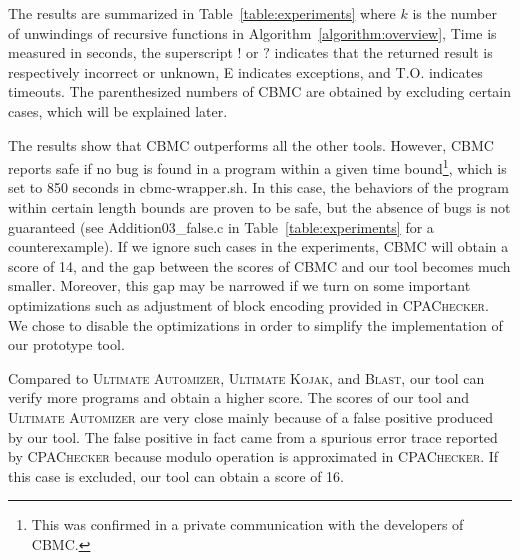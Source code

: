 The results are summarized in
Table~\ref{table:experiments} where $k$ is the number of unwindings of
recursive functions in Algorithm~\ref{algorithm:overview}, Time is
measured in seconds, the superscript $!$ or $?$ indicates that the
returned result is respectively incorrect or unknown, E indicates
exceptions, and T.O. indicates timeouts.
The parenthesized numbers of CBMC are obtained by excluding
certain cases, which will be explained later.

The results show that CBMC outperforms all the other tools.
However, CBMC reports safe if no bug is found in a program within a
given time bound\footnote{This was confirmed in a private
  communication with the developers of CBMC.}, which is set to 850
seconds in cbmc-wrapper.sh.
In this case, the behaviors of the program within certain length
bounds are proven to be safe, but the absence of bugs is not
guaranteed (see Addition03\_false.c in Table~\ref{table:experiments} for
a counterexample).
If we ignore such cases in the experiments, CBMC will obtain a score
of 14, and the gap between the scores of CBMC and our tool becomes
much smaller.
Moreover, this gap may be narrowed if we turn on some important
optimizations such as adjustment of block encoding provided in
\textsc{CPAChecker}.
We chose to disable the optimizations in order to simplify the
implementation of our prototype tool.

Compared to \textsc{Ultimate Automizer}, \textsc{Ultimate Kojak}, and \textsc{Blast},
our tool can verify more programs and obtain a higher score.
The scores of our tool and \textsc{Ultimate Automizer} are very close mainly
because of a false positive produced by our tool.
The false positive in fact came from a spurious error trace reported
by \textsc{CPAChecker} because modulo operation is approximated in
\textsc{CPAChecker}.
If this case is excluded, our tool can obtain a score of 16.





